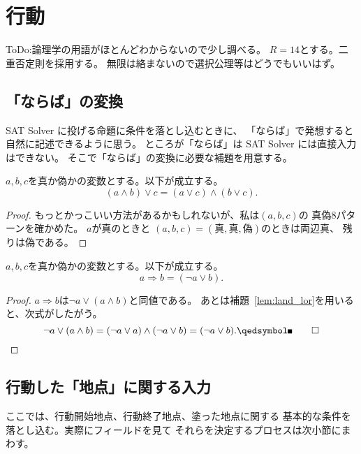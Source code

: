 
\section{行動}

ToDo:論理学の用語がほとんどわからないので少し調べる。
$R = 14$とする。二重否定則を採用する。
無限は絡まないので選択公理等はどうでもいいはず。

\subsection{「ならば」の変換}

SAT Solver に投げる命題に条件を落とし込むときに、
「ならば」で発想すると自然に記述できるように思う。
ところが「ならば」は SAT Solver には直接入力はできない。
そこで「ならば」の変換に必要な補題を用意する。

\begin{lem} \label{lem:land_lor}
 $a, b, c$を真か偽かの変数とする。以下が成立する。
 \[
 (a \land b) \lor c = (a \lor c) \land (b \lor c).
 \]
\end{lem}

\begin{proof}
 もっとかっこいい方法があるかもしれないが、私は$(a, b, c)$の
 真偽$8$パターンを確かめた。
 $a$が真のときと
 $(a, b, c) = (\text{真}, \text{真}, \text{偽})$のときは両辺真、
 残りは偽である。\qedhere
\end{proof}

\begin{cor} \label{cor:rightarrow}
 $a, b, c$を真か偽かの変数とする。以下が成立する。
 \[
  a \Rightarrow b = (\lnot a \lor b).
 \]
\end{cor}

\begin{proof}
 $a \Rightarrow b$は$\lnot a \lor (a \land b)$と同値である。
 あとは補題~\ref{lem:land_lor}を用いると、次式がしたがう。
 \[
  \lnot a \lor (a \land b) = (\lnot a \lor a) \land (\lnot a \lor b)
 = (\lnot a \lor b). \qedhere
 \]
\end{proof}

\subsection{行動した「地点」に関する入力}

ここでは、行動開始地点、行動終了地点、塗った地点に関する
基本的な条件を落とし込む。実際にフィールドを見て
それらを決定するプロセスは次小節にまわす。

